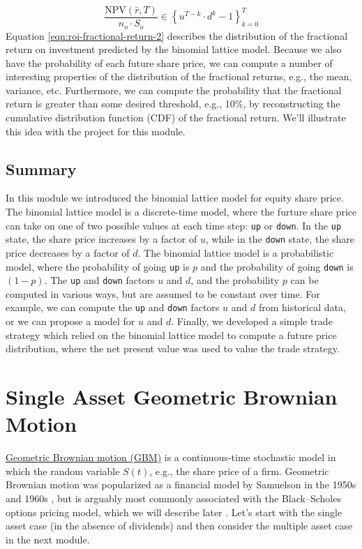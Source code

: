 \documentclass[11pt]{article}
\theoremstyle{definition}
\begin{document}
\begin{equation}\label{eqn:roi-fractional-return-2}
	\frac{\text{NPV}(\bar{r}, T)}{n_{o}\cdot{S_{o}}} \in \left\{u^{T-k}\cdot{d}^{k} - 1\right\}_{k=0}^{T}
\end{equation}
Equation \eqref{eqn:roi-fractional-return-2} describes the distribution of the fractional return on investment 
predicted by the binomial lattice model. Because we also have the probability of each future share price,
we can compute a number of interesting properties of the distribution of the fractional returns, e.g., the mean, variance, etc.
Furthermore, we can compute the probability that the fractional return is greater than some desired threshold, e.g., 10\%, by 
reconstructing the cumulative distribution function (CDF) of the fractional return.
We'll illustrate this idea with the project for this module.

\subsection{Summary}
In this module we introduced the binomial lattice model for equity share price. The binomial lattice model is a discrete-time model, 
where the furture share price can take on one of two possible values at each time step: \texttt{up} or \texttt{down}.
In the \texttt{up} state, the share price increases by a factor of $u$, while in the \texttt{down} state, the share price decreases by a factor of $d$.
The binomial lattice model is a probabilistic model, where the probability of going \texttt{up} is $p$ and the probability of going \texttt{down} is $(1-p)$.
The \texttt{up} and \texttt{down} factors $u$ and $d$, and the probability $p$ can be computed in various ways, but are assumed to be constant over time.
For example, we can compute the \texttt{up} and \texttt{down} factors $u$ and $d$ from historical data, or we can propose a model for $u$ and $d$.
Finally, we developed a simple trade strategy which relied on the binomial lattice model to compute a future price distribution, 
where the net present value was used to value the trade strategy.

\section{Single Asset Geometric Brownian Motion}
\href{https://en.wikipedia.org/wiki/Geometric_Brownian_motion}{Geometric Brownian motion (GBM)} is a continuous-time stochastic model in which the random variable $S(t)$, 
e.g., the share price of a firm. 
Geometric Brownian motion was popularized as a financial model by Samuelson in the 1950s and 1960s \cite{Merton2006}, 
but is arguably most commonly associated with the Black–Scholes options pricing model, which we will describe later 
\cite{BlackScholes1973}. Let's start with the single asset case (in the absence of dividends) 
and then consider the multiple asset case in the next module.
\end{document}
